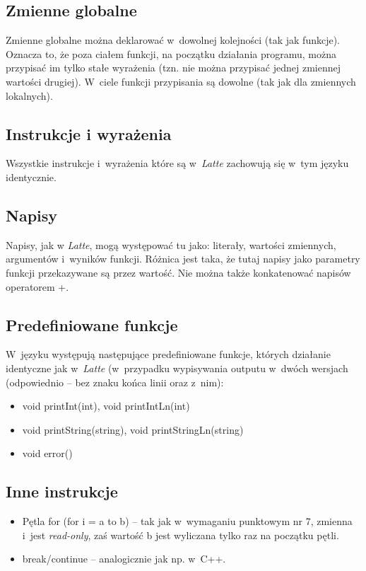 \documentclass{article}
\begin{document}
\subsection{Zmienne globalne}
Zmienne globalne można deklarować w~dowolnej kolejności (tak jak funkcje).
Oznacza to, że poza ciałem funkcji, na początku działania programu, można przypisać im
tylko stałe wyrażenia (tzn. nie można przypisać jednej zmiennej wartości drugiej).
W~ciele funkcji przypisania są dowolne (tak jak dla zmiennych lokalnych).

\subsection{Instrukcje i wyrażenia}
Wszystkie instrukcje i~wyrażenia które są w~\textit{Latte} 
zachowują się w~tym języku identycznie.

\subsection{Napisy}
Napisy, jak w \textit{Latte}, mogą występować tu jako:
literały, wartości zmiennych, argumentów i~wyników funkcji.
Różnica jest taka, że tutaj napisy jako parametry funkcji przekazywane są przez wartość.
Nie można także konkatenować napisów operatorem +.

\subsection{Predefiniowane funkcje}
W~języku występują następujące predefiniowane funkcje, 
których działanie identyczne jak w~\textit{Latte} (w~przypadku wypisywania outputu
w~dwóch wersjach (odpowiednio -- bez znaku końca linii oraz z~nim):
\begin{itemize}
    \item void printInt(int), void printIntLn(int)
    \item void printString(string), void printStringLn(string)
    \item void error()
\end{itemize}

\subsection{Inne instrukcje}
\begin{itemize}
    \item Pętla for (for i = a to b) -- tak jak w~wymaganiu punktowym nr 7,
    zmienna i~jest \textit{read-only}, 
    zaś wartość b jest wyliczana tylko raz na początku pętli.
    \item break/continue -- analogicznie jak np. w~C++.
\end{itemize}
\end{document}
